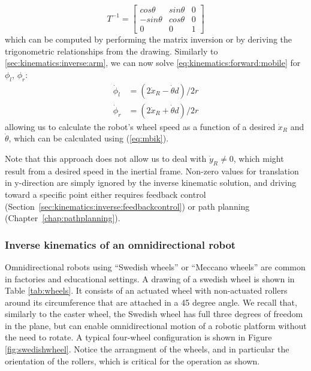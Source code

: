 \begin{equation}
T^{-1}=\left[\begin{array}{ccc}cos \theta & sin \theta & 0 \\ -sin \theta & cos \theta & 0 \\ 0 & 0 & 1\end{array}\right]
\end{equation}
which can be computed by performing the matrix inversion or by deriving the trigonometric relationships from the drawing.  Similarly to \cref{sec:kinematics:inverse:arm}, we can now solve \cref{eq:kinematics:forward:mobile}
for $ \phi_l$, $ \phi_r$:
\begin{eqnarray}
\dot{\phi}_l &= (2\dot{x}_R - \dot{\theta}d)/2r\\
\nonumber
\dot{\phi}_r &= (2\dot{x}_R + \dot{\theta}d)/2r
\end{eqnarray}
allowing us to calculate the robot's wheel speed as a function of a desired $\dot{x}_R$ and $\dot{\theta}$, which can be calculated using (\ref{eq:mbik}).

Note that this approach does not allow us to deal with $\dot{y}_R \neq 0$, which might result from a desired speed in the inertial frame. Non-zero values for translation in y-direction are simply ignored by the inverse kinematic solution, and driving toward a specific point either requires feedback control (Section~\ref{sec:kinematics:inverse:feedbackcontrol}) or path planning (Chapter~\ref{chap:pathplanning}).

\subsubsection{Inverse kinematics of an omnidirectional robot}

Omnidirectional robots using ``Swedish wheels''  or ``Meccano wheels''  are common in factories and educational settings. A drawing of a swedish wheel is shown in Table \ref{tab:wheels}. It consists of an actuated wheel with non-actuated rollers around its circumference that are attached in a 45 degree angle.
%
We recall that, similarly to the caster wheel, the Swedish wheel has full three degrees of freedom in the plane, but can enable omnidirectional motion of a robotic platform without the need to rotate. A typical four-wheel configuration is shown in Figure \ref{fig:swedishwheel}. Notice the arrangment of the wheels, and in particular the orientation of the rollers, which is critical for the operation as shown.


